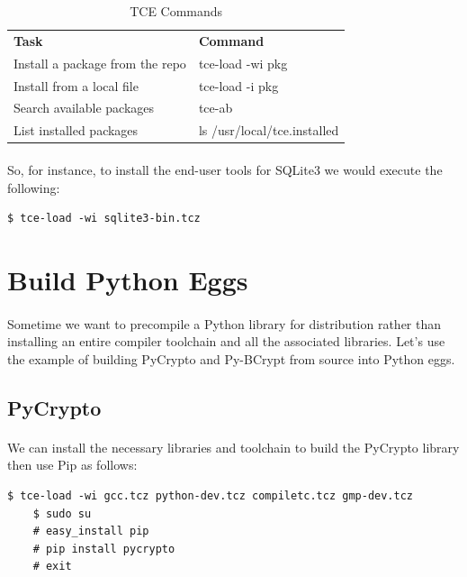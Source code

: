\documentclass[12pt, a4paper, twoside]{book}
\begin{document}
\begin{table}
    \begin{tabular}{ll}
    {\bf Task}                          & {\bf Command} \\
    Install a package from the repo     & tce-load -wi pkg \\
    Install from a local file           & tce-load -i pkg \\
    Search available packages	        & tce-ab \\
    List installed packages             & ls /usr/local/tce.installed \\
    \end{tabular}
    \caption {TCE Commands}
    \label{key-table}
\end{table}

\paragraph{} So, for instance, to install the end-user tools for SQLite3 we would execute the following:

\begin{lstlisting}[style=DOS]
    $ tce-load -wi sqlite3-bin.tcz
\end{lstlisting}

\section{Build Python Eggs}
\label{eggs}
\paragraph{} Sometime we want to precompile a Python library for distribution rather than installing an entire compiler toolchain and all the associated libraries. Let's use the example of building PyCrypto and Py-BCrypt from source into Python eggs.

\subsection{PyCrypto}
\label{pycrypto_egg}

\paragraph{} We can install the necessary libraries and toolchain to build the PyCrypto library then use Pip as follows:

\begin{lstlisting}[style=DOS]
    $ tce-load -wi gcc.tcz python-dev.tcz compiletc.tcz gmp-dev.tcz
    $ sudo su
    # easy_install pip
    # pip install pycrypto
    # exit 
\end{lstlisting}
\end{document}
